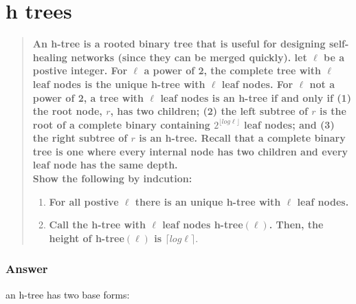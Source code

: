 \documentclass[titlepage]{article}\usepackage[]{graphicx}\usepackage[]{color}
\begin{document}
\section{h trees }
\begin{quote}
\textbf{ An h-tree is a rooted binary tree that is useful for designing self-healing
  networks (since they can be merged quickly). let $\ell$ be a postive integer.
  For $\ell$ a power of 2, the complete tree with $\ell$ leaf nodes is the
  unique h-tree with $\ell$ leaf nodes. For $\ell$ not a power of 2, a tree
  with $\ell$ leaf nodes is an h-tree if and only if (1) the root node, $r$,
  has two children; (2) the left subtree of $r$ is the root of a complete
  binary containing $2^{\lfloor log \ell \rfloor}$ leaf nodes; and (3) the
  right subtree of $r$ is an h-tree. Recall that a complete binary tree is one
  where every internal node has two children and every leaf node has the same
  depth. \\
Show the following by indcution:}

  \begin{enumerate}
	\item\textbf{ For all postive $\ell$ there is an unique h-tree with $\ell $ leaf
	  nodes.}
	\item \textbf{Call the h-tree with $\ell$ leaf nodes h-tree$(\ell)$. Then, the
	  height of h-tree$(\ell)$ is $\lceil log \ell \rceil$}.
  \end{enumerate}
\end{quote}

\subsubsection{Answer}
an h-tree has two base forms:
\end{document}
